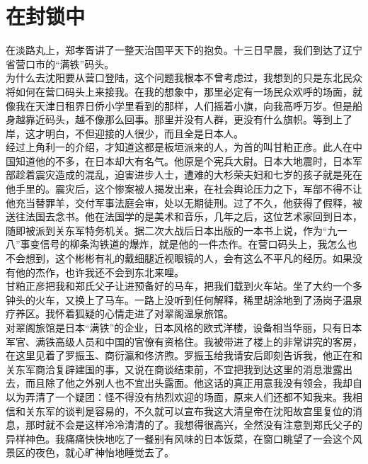 \fancyhead[RO]{} %
\fancyhead[LE]{} %
\chapter*{在封锁中}
\thispagestyle{empty}
在淡路丸上，郑孝胥讲了一整天治国平天下的抱负。十三日早晨，我们到达了辽宁省营口市的“满铁”码头。\\

为什么去沈阳要从营口登陆，这个问题我根本不曾考虑过，我想到的只是东北民众将如何在营口码头上来接我。在我的想象中，那里必定有一场民众欢呼的场面，就像我在天津日租界日侨小学里看到的那样，人们摇着小旗，向我高呼万岁。但是船身越靠近码头，越不像那么回事。那里并没有人群，更没有什么旗帜。等到上了岸，这才明白，不但迎接的人很少，而且全是日本人。\\

经过上角利一的介绍，才知道这都是板垣派来的人，为首的叫甘粕正彦。此人在中国知道他的不多，在日本却大有名气。他原是个宪兵大尉。日本大地震时，日本军部趁着震灾造成的混乱，迫害进步人士，遭难的大杉荣夫妇和七岁的孩子就是死在他手里的。震灾后，这个惨案被人揭发出来，在社会舆论压力之下，军部不得不让他充当替罪羊，交付军事法庭会审，处以无期徒刑。过了不久，他获得了假释，被送往法国去念书。他在法国学的是美术和音乐，几年之后，这位艺术家回到日本，随即被派到关东军特务机关。据二次大战后日本出版的一本书上说，作为“九一八”事变信号的柳条沟铁道的爆炸，就是他的一件杰作。在营口码头上，我怎么也不会想到，这个彬彬有礼的戴细腿近视眼镜的人，会有这么不平凡的经历。如果没有他的杰作，也许我还不会到东北来哩。\\

甘粕正彦把我和郑氏父子让进预备好的马车，把我们载到火车站。坐了大约一个多钟头的火车，又换上了马车。一路上没听到任何解释，稀里胡涂地到了汤岗子温泉疗养区。我怀着狐疑的心情走进了对翠阁温泉旅馆。\\

对翠阁旅馆是日本“满铁”的企业，日本风格的欧式洋楼，设备相当华丽，只有日本军官、满铁高级人员和中国的官僚有资格住。我被带进了楼上的非常讲究的客房，在这里见着了罗振玉、商衍瀛和佟济煦。罗振玉给我请安后即刻告诉我，他正在和关东军商洽复辟建国的事，又说在商谈结束前，不宜把我到达这里的消息泄露出去，而且除了他之外别人也不宜出头露面。他这话的真正用意我没有领会，我却自以为弄清了一个疑团：怪不得没有热烈欢迎的场面，原来人们还都不知我来。我相信和关东军的谈判是容易的，不久就可以宣布我这大清皇帝在沈阳故宫里复位的消息，那时就不会是这样冷冷清清的了。我想得很高兴，全然没有注意到郑氏父子的异样神色。我痛痛快快地吃了一餐别有风味的日本饭菜，在窗口眺望了一会这个风景区的夜色，就心旷神怡地睡觉去了。\\

